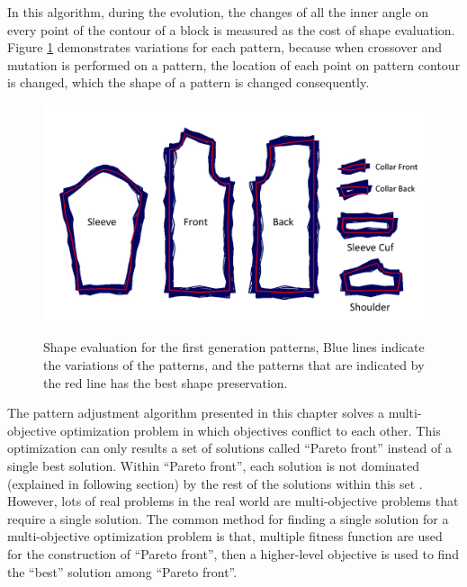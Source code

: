 In this algorithm, during the evolution, the changes of all the inner angle on every point of the contour of a block is measured as the cost of shape evaluation. Figure \ref{figure:shape_evaluation1} demonstrates variations for each pattern, because when crossover and mutation is performed on a pattern, the location of each point on pattern contour is changed, which the shape of a pattern is changed consequently. 

\begin{figure}[H]
	\centering
	\includegraphics[width=1\columnwidth]{../images/MOP_shape_evaluation}\\[0.1cm]
    \caption[Shape evaluation for patterns]{Shape evaluation for the first generation patterns, Blue lines indicate the variations of the patterns, and the patterns that are indicated  by the red line has the best shape preservation.}
    \label{figure:shape_evaluation1}
\end{figure}


The pattern adjustment algorithm presented in this chapter solves a multi-objective optimization problem in which objectives conflict to each other. This optimization can only results a set of solutions called ``Pareto front'' instead of a single best solution. Within ``Pareto front'', each solution is not dominated (explained in following section) by the rest of the solutions within this set . However, lots of real problems in the real world are multi-objective problems that require a single solution. The common method for finding a single solution for a multi-objective optimization problem is that, multiple fitness function are used for the construction of ``Pareto front'', then a higher-level objective is used to find the ``best'' solution among ``Pareto front''. 

